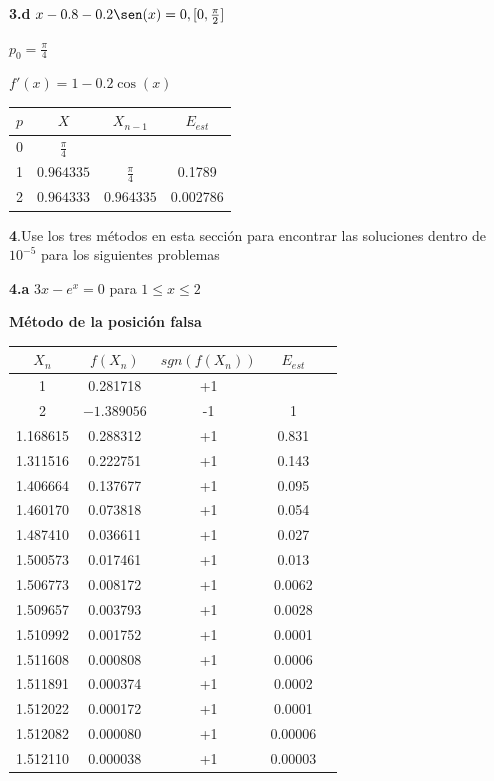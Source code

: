\documentclass[12pt]{article}
\begin{document}
\textbf{3.d} $x - 0.8 -0.2\sen(x) = 0, [0, \frac{\pi}{2}]$ 

$p_0 = \frac{\pi}{4}$

$f'(x) = 1 - 0.2\cos(x)$

\begin{center}
    \begin{tabular}{|c|c|c|c|}
        \hline
        $p$&$X$&$X_{n-1}$&$E_{est}$\\
        \hline
        0 & $\frac{\pi}{4}$&  & \\
        1 &$0.964335$&$\frac{\pi}{4}$&0.1789\\
        2 &$0.964333$&$0.964335$&0.002786\\
        \hline
      \end{tabular} 
\end{center}


\textbf{4}.Use los tres métodos en esta sección para encontrar las soluciones dentro de $10^{-5}$ para los siguientes
problemas

\textbf{4.a} $3x - e^x = 0$  para $ 1\leq x\leq 2$ 

\textbf{Método de la posición falsa}
\normalsize

\begin{center}
    \begin{tabular}{|c|c|c|c|c|}
        \hline
        $X_n$&$f(X_n)$&$sgn(f(X_n))$&$E_{est}$\\
        \hline
        1        &0.281718& +1& \\
        2        &$-1.389056$&-1&1\\
        1.168615 &0.288312&+1&0.831\\
        1.311516 &0.222751&+1&0.143\\
        1.406664 &0.137677&+1&0.095\\
        1.460170 &0.073818&+1&0.054\\
        1.487410 &0.036611&+1&0.027\\
        1.500573 &0.017461&+1&0.013\\
        1.506773 &0.008172&+1&0.0062\\
        1.509657 &0.003793&+1&0.0028\\
        1.510992 &0.001752&+1&0.0001\\
        1.511608 &0.000808&+1&0.0006\\
        1.511891 &0.000374&+1&0.0002\\
        1.512022 &0.000172&+1&0.0001\\
        1.512082 &0.000080&+1&0.00006\\
        1.512110 &0.000038&+1&0.00003\\
        \hline
      \end{tabular} 
\end{center}
\end{document}
